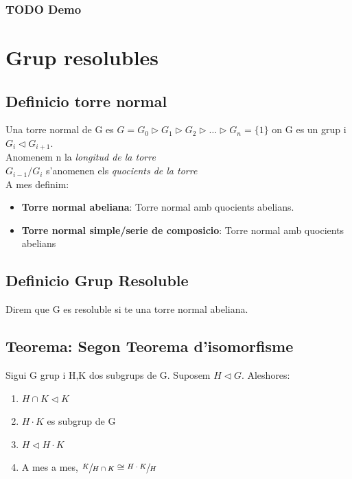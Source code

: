 \documentclass[11pt]{article}
\begin{document}
\subsubsection{{\bfseries\sffamily TODO} Demo}
\label{sec:orgbe0ff8d}

\section{Grup resolubles}
\label{sec:orge00173b}

\subsection{Definicio torre normal}
\label{sec:orge538958}
Una torre normal de G es \(G = G_0 \vartriangleright G_1 \vartriangleright G_2 \vartriangleright \ldots \vartriangleright G_n = \{1\}\) on G es un grup i \(G_i \vartriangleleft G_{i+1}\). \\
Anomenem n la \emph{longitud de la torre} \\
\(G_{i-1}/G_i\) s'anomenen els \emph{quocients de la torre} \\

A mes definim:
\begin{itemize}
\item \textbf{Torre normal abeliana}: Torre normal amb quocients abelians.
\item \textbf{Torre normal simple/serie de composicio}: Torre normal amb quocients abelians
\end{itemize}

\subsection{Definicio Grup Resoluble}
\label{sec:org1b385a8}
Direm que G es resoluble si te una torre normal abeliana.

\subsection{Teorema: Segon Teorema d'isomorfisme}
\label{sec:orgdf9145a}
Sigui G grup i H,K dos subgrups de G. Suposem \(H \vartriangleleft G\). Aleshores:
\begin{enumerate}
\item \(H \cap K \vartriangleleft K\)
\item \(H \cdot K\) es subgrup de G
\item \(H \vartriangleleft H \cdot K\)
\item A mes a mes, \(\sfrac{K}{H \cap K} \cong \sfrac{H \cdot K}{H}\)
\end{enumerate}
\end{document}
